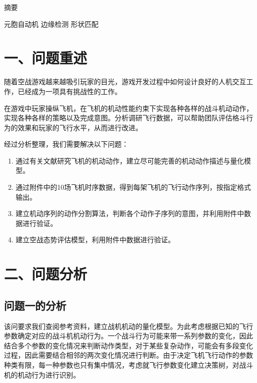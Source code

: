 \documentclass{my_paper}
\begin{document}
\newpage
\begin{center}
\lunwenbiaoti

\vspace{2ex}
\zhaiyao
\end{center}

摘要

\begin{guanjianci}
 元胞自动机 \quad 边缘检测 \quad 形状匹配
\end{guanjianci}

\newpage
\section{一、问题重述}

随着空战游戏越来越吸引玩家的目光，游戏开发过程中如何设计良好的人机交互工作，已经成为一项具有挑战性的工作。

在游戏中玩家操纵飞机，在飞机的机动性能约束下实现各种各样的战斗机动动作，实现各种各样的策略以及完成意图。分析调研飞行数据，可以帮助团队评估格斗行为的效果和玩家的飞行水平，从而进行改进。

经过分析整理，我们需要解决以下问题：
\begin{enumerate}
    \item 通过有关文献研究飞机的机动动作，建立尽可能完善的机动动作描述与量化模型。
    \item 通过附件中的10场飞机时序数据，得到每架飞机的飞行动作序列，按指定格式输出。
    \item 建立机动序列的动作分割算法，判断各个动作子序列的意图，并利用附件中数据进行验证。
    \item 建立空战态势评估模型，利用附件中数据进行验证。
\end{enumerate}
\section{二、问题分析}
\subsection{问题一的分析}

该问要求我们查阅参考资料，建立战机机动的量化模型。为此考虑根据已知的飞行参数确定对应的战斗机机动行为。一个战斗行为可能来带一系列参数的变化，因此结合多个参数的变化情况来判断动作类型，对于某些复杂动作，可能会有多段变化过程，因此需要结合相邻的两次变化情况进行判断。由于决定飞机飞行动作的参数种类有限，每一种参数也只有集中情况，考虑就飞行参数变化建立决策树，对战斗机的机动行为进行识别。
\end{document}
